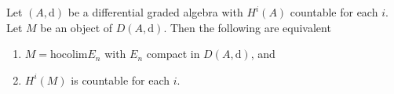 %
\begin{lemma}
\label{lemma-countable}
Let $(A, \text{d})$ be a differential graded algebra with
$H^i(A)$ countable for each $i$. Let $M$ be an object of $D(A, \text{d})$.
Then the following are equivalent
\begin{enumerate}
\item $M = \text{hocolim} E_n$ with $E_n$ compact in $D(A, \text{d})$, and
\item $H^i(M)$ is countable for each $i$.
\end{enumerate}
\end{lemma}

